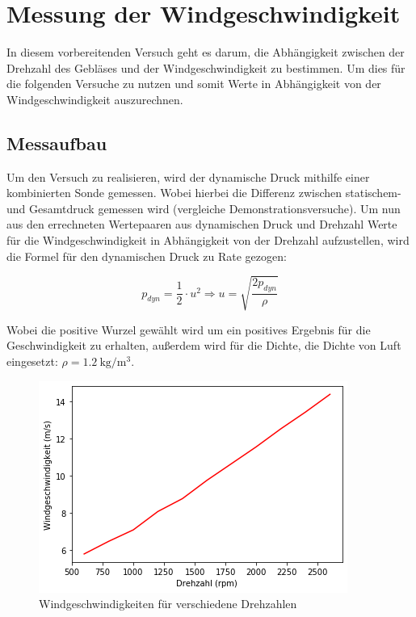 \section{Messung der Windgeschwindigkeit}

In diesem vorbereitenden Versuch geht es darum, die Abhängigkeit zwischen der Drehzahl des Gebläses und der Windgeschwindigkeit zu bestimmen. Um dies für die folgenden Versuche zu nutzen und somit Werte in Abhängigkeit von der Windgeschwindigkeit auszurechnen.

\subsection{Messaufbau}

Um den Versuch zu realisieren, wird der dynamische Druck mithilfe einer kombinierten Sonde gemessen. Wobei hierbei die Differenz zwischen statischem- und Gesamtdruck gemessen wird (vergleiche Demonstrationsversuche). Um nun aus den errechneten Wertepaaren aus dynamischen Druck und Drehzahl Werte für die Windgeschwindigkeit in Abhängigkeit von der Drehzahl aufzustellen, wird die Formel für den dynamischen Druck zu Rate gezogen: 

\begin{equation}
    p_{dyn} = \frac{1}{2} \cdot u^2
    \Rightarrow u = \sqrt{\frac{2p_{dyn}}{\rho}}
\end{equation}

Wobei die positive Wurzel gewählt wird um ein positives Ergebnis für die Geschwindigkeit zu erhalten, außerdem wird für die Dichte, die Dichte von Luft eingesetzt: $\rho = \SI{1.2}{\kg\per\cubic\m}$.

\begin{figure}[h]
    \centering
    \includegraphics[scale=0.8]{Aeromechanik/Protokoll/fig/Aeromechanik Versuch 1.2.png}
    \caption{Windgeschwindigkeiten für verschiedene Drehzahlen}
    \label{fig:Aeromechanik Versuch 1.2}
\end{figure}